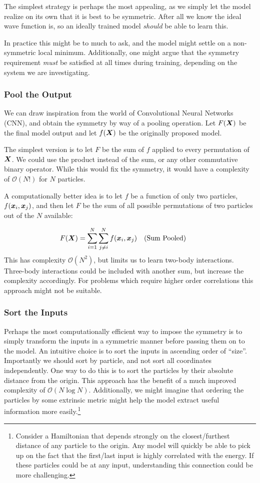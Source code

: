 \documentclass[Thesis.tex]{subfiles}
\begin{document}
The simplest strategy is perhaps the most appealing, as we simply let the model
realize on its own that  it is best to be symmetric. After all we know the ideal
wave function is, so an ideally trained model \emph{should} be able to learn
this.

In practice this might be to much to ask, and the model might settle on a
non-symmetric local minimum. Additionally, one might argue that the symmetry
requirement \emph{must} be satisfied at all times during training, depending on
the system we are investigating.


\subsubsection{Pool the Output}

We can draw inspiration from the world of Convolutional Neural Networks (CNN),
and obtain the symmetry by way of a pooling operation. Let $F(\bm{X})$ be the final
model output and let $f(\bm{X})$ be the originally proposed model.

The simplest version is to let $F$ be the sum of $f$ applied to every
permutation of $\bm{X}$. We could use the product instead of the sum, or any other
commutative binary operator. While this would fix the symmetry, it would have a
complexity of $\mathcal{O}(N!)$ for $N$ particles.

A computationally better idea is to let $f$ be a function of only two particles,
$f(\bm{x}_i, \bm{x}_j)$, and then let $F$ be the sum of all possible permutations of
two particles out of the $N$ available:

\begin{align}
  \label{eq:sum-pooling}
  F(\vX) &= \sum_{i=1}^N\sum_{j\neq i}^N f(\vx_i, \vx_j)\qq{(Sum Pooled)}
\end{align}
This has complexity $\mathcal{O}(N^2)$, but limits us to learn
two-body interactions. Three-body interactions could be included with another
sum, but increase the complexity accordingly. For problems which require higher
order correlations this approach might not be suitable.

\subsubsection{Sort the Inputs}

Perhaps the most computationally efficient way to impose the symmetry is to
simply transform the inputs in a symmetric manner before passing them on to the
model. An intuitive choice is to sort the inputs in ascending order of ``size''.
Importantly we should sort by particle, and not sort all coordinates
independently. One way to do this is to sort the particles by their absolute
distance from the origin. This approach has the benefit of a much improved
complexity of $\mathcal{O}(N\log N)$. Additionally, we might
imagine that ordering the particles by some extrinsic metric might help the
model extract useful information more easily.\footnote{Consider a Hamiltonian
  that depends strongly on the closest/furthest distance of any particle to the
  origin. Any model will quickly be able to pick up on the fact that the
  first/last input is highly correlated with the energy. If these particles
  could be at any input, understanding this connection could be more challenging.}
\end{document}
